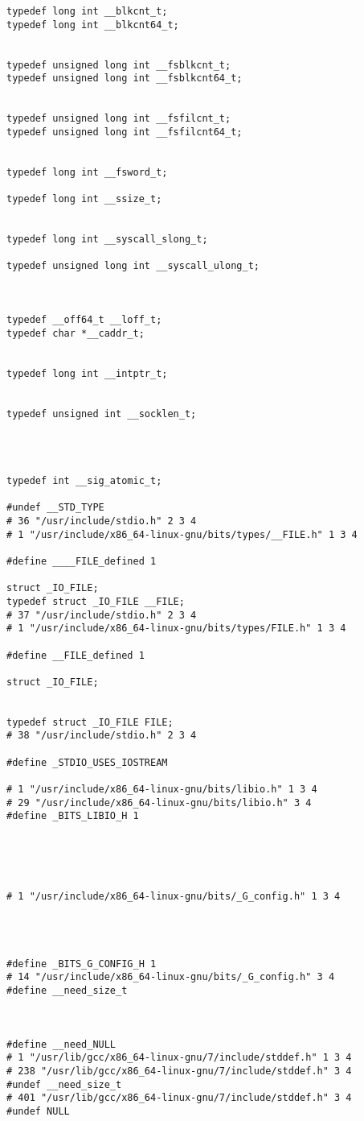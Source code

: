 \documentclass[11pt]{article}
\begin{document}
\begin{enumerate}
\begin{verbatim}
typedef long int __blkcnt_t;
typedef long int __blkcnt64_t;


typedef unsigned long int __fsblkcnt_t;
typedef unsigned long int __fsblkcnt64_t;


typedef unsigned long int __fsfilcnt_t;
typedef unsigned long int __fsfilcnt64_t;


typedef long int __fsword_t;

typedef long int __ssize_t;


typedef long int __syscall_slong_t;

typedef unsigned long int __syscall_ulong_t;



typedef __off64_t __loff_t;
typedef char *__caddr_t;


typedef long int __intptr_t;


typedef unsigned int __socklen_t;




typedef int __sig_atomic_t;

#undef __STD_TYPE
# 36 "/usr/include/stdio.h" 2 3 4
# 1 "/usr/include/x86_64-linux-gnu/bits/types/__FILE.h" 1 3 4

#define ____FILE_defined 1

struct _IO_FILE;
typedef struct _IO_FILE __FILE;
# 37 "/usr/include/stdio.h" 2 3 4
# 1 "/usr/include/x86_64-linux-gnu/bits/types/FILE.h" 1 3 4

#define __FILE_defined 1

struct _IO_FILE;


typedef struct _IO_FILE FILE;
# 38 "/usr/include/stdio.h" 2 3 4

#define _STDIO_USES_IOSTREAM 

# 1 "/usr/include/x86_64-linux-gnu/bits/libio.h" 1 3 4
# 29 "/usr/include/x86_64-linux-gnu/bits/libio.h" 3 4
#define _BITS_LIBIO_H 1





# 1 "/usr/include/x86_64-linux-gnu/bits/_G_config.h" 1 3 4




#define _BITS_G_CONFIG_H 1
# 14 "/usr/include/x86_64-linux-gnu/bits/_G_config.h" 3 4
#define __need_size_t 



#define __need_NULL 
# 1 "/usr/lib/gcc/x86_64-linux-gnu/7/include/stddef.h" 1 3 4
# 238 "/usr/lib/gcc/x86_64-linux-gnu/7/include/stddef.h" 3 4
#undef __need_size_t
# 401 "/usr/lib/gcc/x86_64-linux-gnu/7/include/stddef.h" 3 4
#undef NULL





\end{verbatim}
\end{enumerate}
\end{document}

